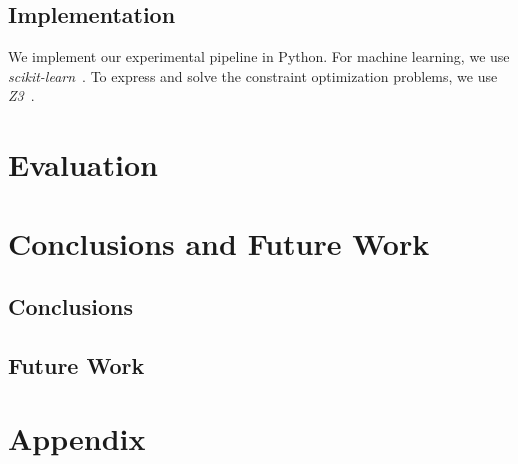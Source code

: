 \documentclass{article}
\begin{document}
\subsection{Implementation}

We implement our experimental pipeline in Python.
For machine learning, we use \emph{scikit-learn}~\cite{pedregosa2011scikit-learn}.
To express and solve the constraint optimization problems, we use \emph{Z3}~\cite{deMoura2008z3}.

\section{Evaluation}
\label{sec:evaluation}

\section{Conclusions and Future Work}
\label{sec:conclusion}

\subsection{Conclusions}

\subsection{Future Work}

\printbibliography

\appendix

\section{Appendix}
\label{sec:appendix}
\end{document}
